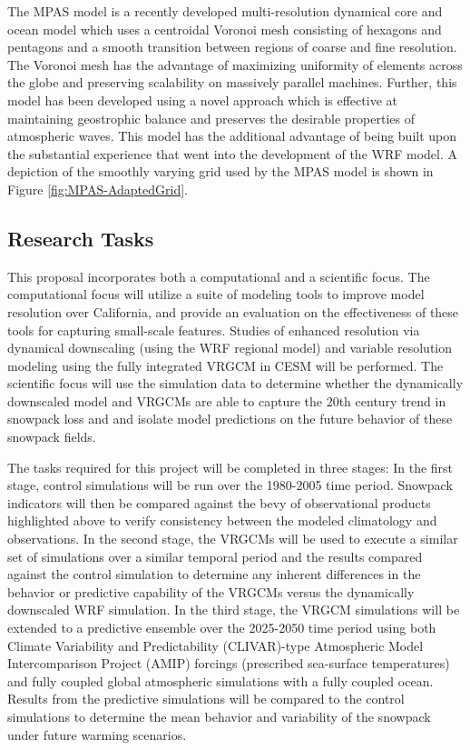 \documentclass[11pt]{article}
\begin{document}
The MPAS model \citep{WCSJBKMGDLDFSHPTDR2012MWR} is a recently developed multi-resolution dynamical core and ocean model which uses a centroidal Voronoi mesh consisting of hexagons and pentagons and a smooth transition between regions of coarse and fine resolution.  The Voronoi mesh has the advantage of maximizing uniformity of elements across the globe and preserving scalability on massively parallel machines.  Further, this model has been developed using a novel approach \citep{JTTDRWCSJBK2009JCP} which is effective at maintaining geostrophic balance and preserves the desirable properties of atmospheric waves.  This model has the additional advantage of being built upon the substantial experience that went into the development of the WRF model.  A depiction of the smoothly varying grid used by the MPAS model is shown in Figure \ref{fig:MPAS-AdaptedGrid}.

\subsection{Research Tasks}

This proposal incorporates both a computational and a scientific focus. The computational focus will utilize a suite of modeling tools to improve model resolution over California, and provide an evaluation on the effectiveness of these tools for capturing small-scale features. Studies of enhanced resolution via dynamical downscaling (using the WRF regional model) and variable resolution modeling using the fully integrated VRGCM in CESM will be performed. The scientific focus will use the simulation data to determine whether the dynamically downscaled model and VRGCMs are able to capture the 20th century trend in snowpack loss and and isolate model predictions on the future behavior of these snowpack fields.

The tasks required for this project will be completed in three stages: In the first stage, control simulations will be run over the 1980-2005 time period. Snowpack indicators will then be compared against the bevy of observational products highlighted above to verify consistency between the modeled climatology and observations. In the second stage, the VRGCMs will be used to execute a similar set of simulations over a similar temporal period and the results compared against the control simulation to determine any inherent differences in the behavior or predictive capability of the VRGCMs versus the dynamically downscaled WRF simulation. In the third stage, the VRGCM simulations will be extended to a predictive ensemble over the 2025-2050 time period using both Climate Variability and Predictability (CLIVAR)-type Atmospheric Model Intercomparison Project (AMIP) forcings (prescribed sea-surface temperatures) and fully coupled global atmospheric simulations with a fully coupled ocean. Results from the predictive simulations will be compared to the control simulations to determine the mean behavior and variability of the snowpack under future warming scenarios.
\end{document}
